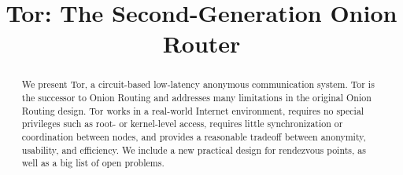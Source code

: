 \documentclass[times,10pt,twocolumn]{article}
\begin{document}

\title{Tor: The Second-Generation Onion Router}


\maketitle
\thispagestyle{empty}

\begin{abstract}
We present Tor, a circuit-based low-latency anonymous communication
system. Tor is the successor to Onion Routing
and addresses many limitations in the original Onion Routing design.
Tor works in a real-world Internet environment, requires no special
privileges such as root- or kernel-level access,
requires little synchronization or coordination between nodes, and
provides a reasonable tradeoff between anonymity, usability, and efficiency.
We include a new practical design for rendezvous points, as well
as a big list of open problems.
\end{abstract}



\label{sec:intro}
\end{document}
